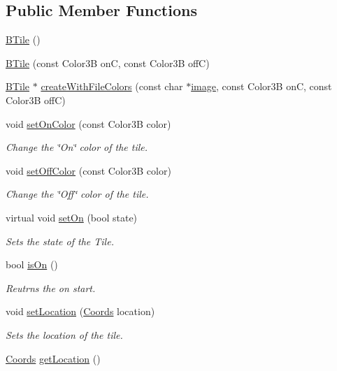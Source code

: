 \subsection*{\-Public \-Member \-Functions}
\begin{DoxyCompactItemize}
\item 
\hyperlink{class_b_tile_a7646b89b701a776494e16405b9d90871}{\-B\-Tile} ()
\item 
\hyperlink{class_b_tile_a3bf473aada31f2a76de8ea244d889d16}{\-B\-Tile} (const \-Color3\-B on\-C, const \-Color3\-B off\-C)
\item 
\hyperlink{class_b_tile}{\-B\-Tile} $\ast$ \hyperlink{class_b_tile_a238d813159a2c767471ad12e3ada7421}{create\-With\-File\-Colors} (const char $\ast$\hyperlink{_game_list_8h_ac745ab21f82aa96829863dcfc37ef5a8}{image}, const \-Color3\-B on\-C, const \-Color3\-B off\-C)
\item 
void \hyperlink{class_b_tile_abb4e47d337854e27649b6505536a8d4a}{set\-On\-Color} (const \-Color3\-B color)
\begin{DoxyCompactList}\small\item\em \-Change the \char`\"{}\-On\char`\"{} color of the tile. \end{DoxyCompactList}\item 
void \hyperlink{class_b_tile_a992da9e2ba93dfffb623af6905d5d4ae}{set\-Off\-Color} (const \-Color3\-B color)
\begin{DoxyCompactList}\small\item\em \-Change the \char`\"{}\-Off\char`\"{} color of the tile. \end{DoxyCompactList}\item 
virtual void \hyperlink{class_b_tile_add471df28a98f6fcb4a3ca7409092fad}{set\-On} (bool state)
\begin{DoxyCompactList}\small\item\em \-Sets the state of the \-Tile. \end{DoxyCompactList}\item 
bool \hyperlink{class_b_tile_ab59bb83ecf56ec30d95c98ab3090d532}{is\-On} ()
\begin{DoxyCompactList}\small\item\em \-Reutrns the on start. \end{DoxyCompactList}\item 
void \hyperlink{class_b_tile_a64dfa0b2841ab4fc5a1e465f1389cb10}{set\-Location} (\hyperlink{struct_coords}{\-Coords} location)
\begin{DoxyCompactList}\small\item\em \-Sets the location of the tile. \end{DoxyCompactList}\item 
\hyperlink{struct_coords}{\-Coords} \hyperlink{class_b_tile_af0e20c14792be231f3b490eb1ec10a73}{get\-Location} ()
\end{DoxyCompactItemize}
